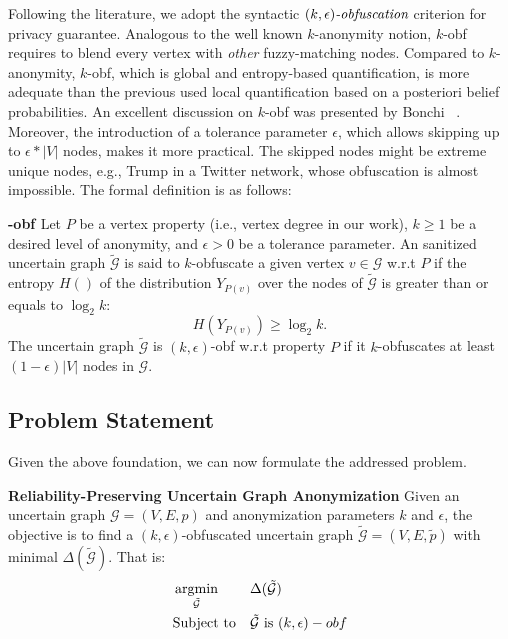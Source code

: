 Following the literature, we adopt the syntactic $\textit{$(k,\epsilon)$-obfuscation}$ criterion for privacy guarantee. 
Analogous to the well known $k$-anonymity notion, $k$-obf requires to blend every vertex with \emph{other} fuzzy-matching nodes. 
Compared to $k$-anonymity, $k$-obf, which is global and entropy-based quantification, is more adequate than the previous used local quantification based on a posteriori belief probabilities. An excellent discussion on $k$-obf was presented by Bonchi {\etal}~\cite{Bonchi_Identity_2014}. 
Moreover, the introduction of a tolerance parameter $\epsilon$, which allows skipping up to $\epsilon * |V|$ nodes, makes it more practical. The skipped nodes might be extreme unique nodes, e.g., Trump in a Twitter network, whose obfuscation is almost impossible.
The formal definition is as follows:
\theoremstyle{definition}
\begin{definition}
	\textbf{-obf \cite{Boldi_Injecting_2012}}
    Let $P$ be a vertex property (i.e., vertex degree in our work), $k \geq 1$ be a desired level of anonymity, and $\epsilon >0 $ be a tolerance parameter. 
    An sanitized uncertain graph $\tilde{\mathcal{G}}$ is said to $k$-obfuscate a given vertex $v \in \mathcal{G}$ w.r.t $P$ if the entropy $H()$ of the distribution $Y_{P(v)}$ over the nodes 
    of $\tilde{\mathcal{G}}$ is greater than or equals to $\log_{2}{k}$:
    \begin{equation*}
        H(Y_{P(v)}) \geq \log_{2}{k}.
    \label{obfCon}
    \end{equation*}
The uncertain graph $\tilde{\mathcal{G}}$
is $(k,\epsilon)$-obf w.r.t property $P$ 
if it $k$-obfuscates at least $(1-\epsilon)|V|$ nodes in $\mathcal{G}$. 
\label{def:obf}
\end{definition} 

\subsection{Problem Statement}
Given the above foundation, we can now formulate the addressed problem.  
\begin{problem}
	\textbf{Reliability-Preserving Uncertain Graph Anonymization}
     Given an uncertain graph $\mathcal{G}=(V,E,\mathit{p})$ and anonymization parameters $k$ and $\epsilon$, 
     the objective is to find a  $(k,\epsilon)$-obfuscated uncertain graph $\tilde{\mathcal{G}}=(V,E,\tilde{\mathit{p}})$ 
     with minimal  $\Delta(\tilde{\mathcal{G}})$. That is:
     \begin{equation*}
             \begin{aligned}
                 & \argmin_{\tilde{
                \mathcal{G}}} & & \Delta(\tilde{\mathcal{G}}) \\
                &  \text{Subject to} & &\tilde{\mathcal{G}} \text{~is~} (k,\epsilon)-obf
            \end{aligned}
     \end{equation*}
     \label{prob:unobf}
\end{problem}